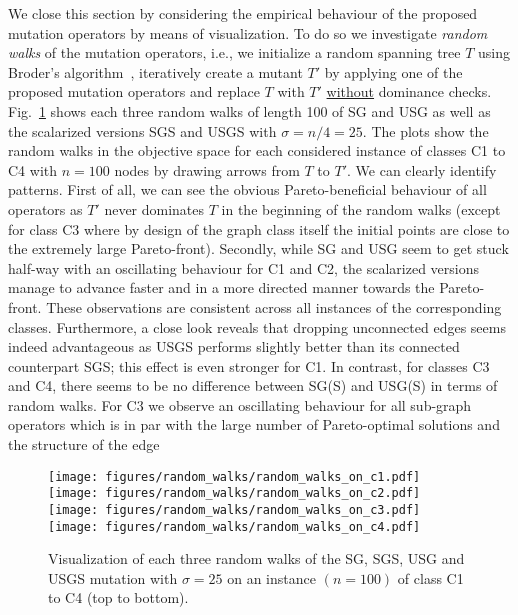 \documentclass[twoside]{article}
\begin{document}
We close this section by considering the empirical behaviour of the proposed mutation operators by means of visualization. To do so we investigate \emph{random walks} of the mutation operators, i.e., we initialize a random spanning tree $T$ using Broder's algorithm~\citep{broder1989RandomSpanningTrees}, iteratively create a mutant $T'$ by applying one of the proposed mutation operators and replace $T$ with $T'$ \underline{without} dominance checks. Fig.~\ref{fig:random_walk_gallery} shows each three random walks of length 100 of SG and USG as well as the scalarized versions SGS and USGS with $\sigma = n/4 = 25$. The plots show the random walks in the objective space for each considered instance of classes C1 to C4 with $n = 100$ nodes by drawing arrows from $T$ to $T'$. We can clearly identify patterns. First of all, we can see the obvious Pareto-beneficial behaviour of all operators as $T'$ never dominates $T$ in the beginning of the random walks (except for class C3 where by design of the graph class itself the initial points are close to the extremely large Pareto-front). Secondly, while SG and USG seem to get stuck half-way with an oscillating behaviour for C1 and C2, the scalarized versions manage to advance faster and in a more directed manner towards the Pareto-front. These observations are consistent across all instances of the corresponding classes. Furthermore, a close look reveals that dropping unconnected edges seems indeed advantageous as USGS performs slightly better than its connected counterpart SGS; this effect is even stronger for C1.
In contrast, for classes C3 and C4, there seems to be no difference between SG(S) and USG(S) in terms of random walks. For C3 we observe an oscillating behaviour for all sub-graph operators which is in par with the large number of Pareto-optimal solutions and the structure of the edge 
\begin{figure}[h!]
    \centering
    \texttt{[image: figures/random\_walks/random\_walks\_on\_c1.pdf]}
    \texttt{[image: figures/random\_walks/random\_walks\_on\_c2.pdf]}
    \texttt{[image: figures/random\_walks/random\_walks\_on\_c3.pdf]}
    \texttt{[image: figures/random\_walks/random\_walks\_on\_c4.pdf]}
    \caption{Visualization of each three random walks of the SG, SGS, USG and USGS mutation with $\sigma = 25$ on an instance $(n=100)$ of class C1 to C4 (top to bottom).}
    \label{fig:random_walk_gallery}
\end{figure}
\end{document}
